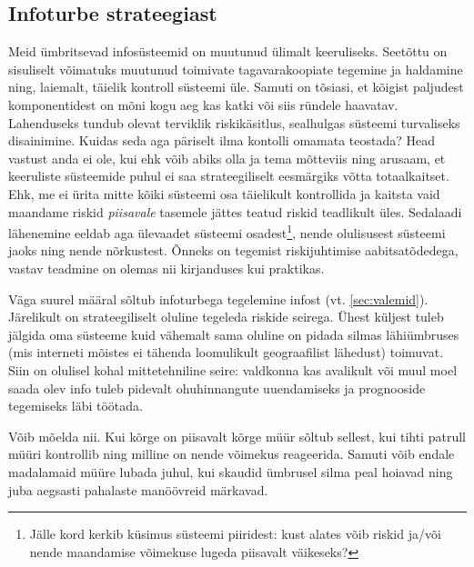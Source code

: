 \documentclass{article}
\begin{document}
\subsection{Infoturbe strateegiast}
Meid ümbritsevad infosüsteemid on muutunud ülimalt keeruliseks. Seetõttu on sisuliselt võimatuks muutunud toimivate tagavarakoopiate tegemine ja haldamine ning, laiemalt, täielik kontroll süsteemi üle. Samuti on tõsiasi, et kõigist paljudest komponentidest on mõni kogu aeg kas katki või siis ründele haavatav. Lahenduseks tundub olevat terviklik riskikäsitlus, sealhulgas süsteemi turvaliseks disainimine. Kuidas seda aga päriselt ilma kontolli omamata teostada? Head vastust anda ei ole, kui ehk võib abiks olla \cite{leveson2011engineering} ja tema mõtteviis ning arusaam, et keeruliste süsteemide puhul ei saa strateegiliselt eesmärgiks võtta totaalkaitset. Ehk, me ei ürita mitte kõiki süsteemi osa täielikult kontrollida ja kaitsta vaid maandame riskid \emph{piisavale} tasemele jättes teatud riskid teadlikult üles. Sedalaadi lähenemine eeldab aga ülevaadet süsteemi osadest\footnote{Jälle kord kerkib küsimus süsteemi piiridest: kust alates võib riskid ja/või nende maandamise võimekuse lugeda piisavalt väikeseks?}, nende olulisusest süsteemi jaoks ning nende nõrkustest. Õnneks on tegemist riskijuhtimise aabitsatõdedega, vastav teadmine on olemas nii kirjanduses kui praktikas. 

Väga suurel määral sõltub infoturbega tegelemine infost (vt. \ref{sec:valemid}). Järelikult on strateegiliselt oluline tegeleda riskide seirega. Ühest küljest tuleb jälgida oma süsteeme kuid vähemalt sama oluline on pidada silmas lähiümbruses (mis interneti mõistes ei tähenda loomulikult geograafilist lähedust) toimuvat. Siin on olulisel kohal mittetehniline seire: valdkonna kas avalikult või muul moel saada olev info tuleb pidevalt ohuhinnangute uuendamiseks ja prognooside tegemiseks läbi töötada. 

Võib mõelda nii. Kui kõrge on piisavalt kõrge müür sõltub sellest, kui tihti patrull müüri kontrollib ning milline on nende võimekus reageerida. Samuti võib endale madalamaid müüre lubada juhul, kui skaudid ümbrusel silma peal hoiavad ning juba aegsasti pahalaste manöövreid märkavad. 
\end{document}
